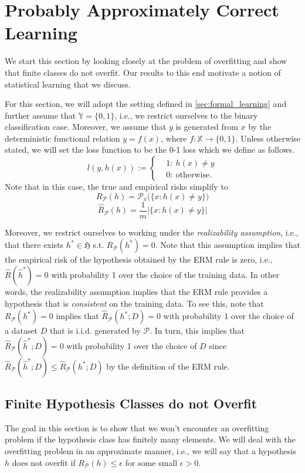 \section{Probably Approximately Correct Learning}

We start this section by looking closely at the problem of overfitting and show that
finite classes do not overfit. Our results to this end motivate a notion of
statistical learning that we discuss.

For this section, we will adopt the setting defined in
\autoref{sec:formal_learning} and further assume that $\mathbb{Y} = \{0,1\}$,
i.e., we restrict ourselves to the binary classification case. Moreover, we
assume that $y$
is generated from $x$ by the deterministic functional relation $y=f(x)$, where $f: \mathbb{X}
\to \{0,1\}$. Unless otherwise stated, we will set the loss function to be the 0-1 loss
which
we define as follows.
\begin{equation*}
    l(y, h(x)) :=
    \begin{cases}
         & 1: \ h(x) \neq y \\
        & 0: \ \text{otherwise}.
    \end{cases}	
\end{equation*}
Note that in this case, the true and empirical risks simplify to
$$
R_{\mathcal{P}}(h) = \mathcal{P}_x \bigl(\{x: h(x) \neq y\} \bigr)
$$
$$
\hat{R}_{\mathcal{P}}(h) = \frac{1}{m} | \{x: h(x) \neq y\} |
$$

Moreover, we restrict ourselves to working under the  
 \emph{realizability assumption}, i.e., that
there exists $h^* \in \mathfrak{H}$ s.t. $R_{\mathcal{P}}(h^*) = 0$. Note that
this assumption implies that the empirical risk of the hypothesis obtained by
the ERM rule is zero, i.e., $\hat{R}(\hat{h}^*) = 0$ with probability 1 over the
choice of the training data. In other words, the realizability assumption
implies that the ERM rule provides a hypothesis that is \emph{consistent} on the
training data. To see this, note that $R_\mathcal{P}(h^*)=0$ implies
that $\hat{R}_\mathcal{P}(h^*;D)=0$ with probability 1 over the choice of a
dataset $D$ that is i.i.d. generated by $\mathcal{P}$. In turn, this implies
that $\hat{R}_\mathcal{P}(\hat{h}^*;D)=0$ with probability 1 over the choice of
$D$ since $\hat{R}_\mathcal{P}(\hat{h}^*;D) \leq \hat{R}_\mathcal{P}(h^*;D)$ by
the definition of the ERM rule.

\subsection{Finite Hypothesis Classes do not Overfit}
The goal in this section is to show that we won't encounter an overfitting
problem if the hypothesis class has finitely many elements. We will deal with
the overfitting problem in an approximate manner, i.e., we will say that a
hypothesis $h$ does not overfit if $R_\mathcal{P}(h)\leq \epsilon$ for some
small $\epsilon>0$.

